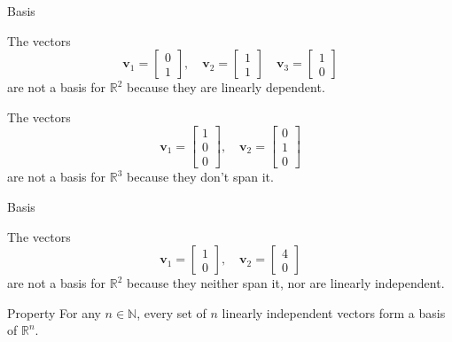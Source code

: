\documentclass{beamer}
\newcommand{\vv}{\mathbf{v}}
\newcommand{\N}{\mathbb{N}}
\newcommand{\R}{\mathbb{R}}
\begin{document}
\begin{frame}{Basis}

  \begin{example}
    The vectors
    \[
    \vv_1 = \begin{bmatrix} 0 \\ 1 \end{bmatrix}, \quad 
    \vv_2 = \begin{bmatrix} 1 \\ 1 \end{bmatrix} \quad 
    \vv_3 = \begin{bmatrix} 1 \\ 0 \end{bmatrix}
    \]
    \pause are not a basis for $\R^2$ because they are linearly dependent.
  \end{example}
  \pause
  
  \begin{example}
    The vectors
    \[
    \vv_1 = \begin{bmatrix} 1 \\ 0 \\ 0 \end{bmatrix}, \quad 
    \vv_2 = \begin{bmatrix} 0 \\ 1 \\ 0 \end{bmatrix} 
    \]
    \pause are not a basis for $\R^3$ because they don't span it.
  \end{example}
  
\end{frame}


\begin{frame}{Basis}
  
  \begin{example}
    The vectors
    \[
    \vv_1 = \begin{bmatrix} 1 \\ 0 \end{bmatrix}, \quad 
    \vv_2 = \begin{bmatrix} 4 \\ 0 \end{bmatrix} 
    \]
    \pause are not a basis for $\R^2$ because they neither span it, nor are linearly independent.
  \end{example}
  \pause
  
\begin{block}{Property}
    For any $n\in\N$, every set of $n$ linearly independent vectors form a basis of $\R^n$.
    \end{block}
\end{frame}
\end{document}
